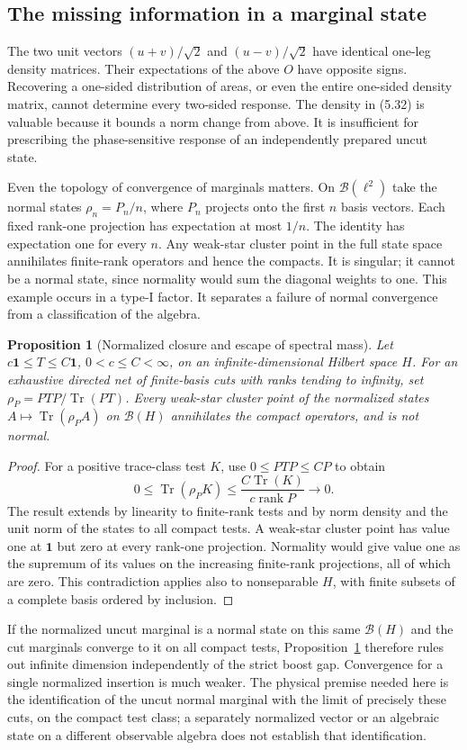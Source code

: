 \documentclass[11pt]{article}
\newcommand{\Tr}{\operatorname{Tr}}
\newcommand{\id}{\mathbf{1}}
\DeclareMathOperator{\rank}{rank}
\newtheorem{prop}{Proposition}
\begin{document}
\subsection{The missing information in a marginal state}
The two unit vectors $(u+v)/\sqrt2$ and $(u-v)/\sqrt2$ have identical one-leg density matrices. Their expectations of the above $O$ have opposite signs. Recovering a one-sided distribution of areas, or even the entire one-sided density matrix, cannot determine every two-sided response. The density in (5.32) is valuable because it bounds a norm change from above. It is insufficient for prescribing the phase-sensitive response of an independently prepared uncut state.

Even the topology of convergence of marginals matters. On $\mathcal B(\ell^2)$ take the normal states $\rho_n=P_n/n$, where $P_n$ projects onto the first $n$ basis vectors. Each fixed rank-one projection has expectation at most $1/n$. The identity has expectation one for every $n$. Any weak-star cluster point in the full state space annihilates finite-rank operators and hence the compacts. It is singular; it cannot be a normal state, since normality would sum the diagonal weights to one. This example occurs in a type-I factor. It separates a failure of normal convergence from a classification of the algebra.

\begin{prop}[Normalized closure and escape of spectral mass]\label{prop:normal}
Let $c\id\le T\le C\id$, $0<c\le C<\infty$, on an infinite-dimensional Hilbert space $H$. For an exhaustive directed net of finite-basis cuts with ranks tending to infinity, set $\rho_P=PTP/\Tr(PT)$. Every weak-star cluster point of the normalized states $A\mapsto\Tr(\rho_PA)$ on $\mathcal B(H)$ annihilates the compact operators, and is not normal.
\end{prop}
\begin{proof}
For a positive trace-class test $K$, use $0\le PTP\le CP$ to obtain
\[
 0\le\Tr(\rho_PK)\le\frac{C\Tr(K)}{c\rank P}\longrightarrow0.
\]
The result extends by linearity to finite-rank tests and by norm density and the unit norm of the states to all compact tests. A weak-star cluster point has value one at $\id$ but zero at every rank-one projection. Normality would give value one as the supremum of its values on the increasing finite-rank projections, all of which are zero. This contradiction applies also to nonseparable $H$, with finite subsets of a complete basis ordered by inclusion.
\end{proof}
If the normalized uncut marginal is a normal state on this same $\mathcal B(H)$ and the cut marginals converge to it on all compact tests, Proposition~\ref{prop:normal} therefore rules out infinite dimension independently of the strict boost gap. Convergence for a single normalized insertion is much weaker. The physical premise needed here is the identification of the uncut normal marginal with the limit of precisely these cuts, on the compact test class; a separately normalized vector or an algebraic state on a different observable algebra does not establish that identification.
\end{document}
